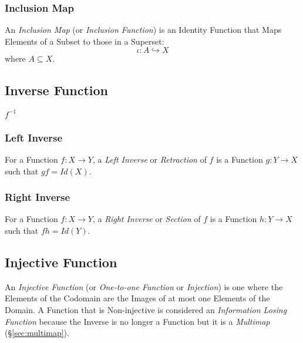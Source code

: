 \subsubsection{Inclusion Map}\label{sec:inclusion_map}

An \emph{Inclusion Map} (or \emph{Inclusion Function}) is an Identity
Function that Maps Elements of a Subset to those in a Superset:
\[
  \iota : A \hookrightarrow X
\]
where $A \subseteq X$.



\subsection{Inverse Function}\label{sec:inverse_function}

$f^{-1}$



\subsubsection{Left Inverse}\label{sec:left_inverse}

For a Function $f: X \rightarrow Y$, a \emph{Left Inverse} or
\emph{Retraction} of $f$ is a Function $g: Y \rightarrow X$ such that
$gf = Id(X)$.



\subsubsection{Right Inverse}\label{sec:right_inverse}

For a Function $f: X \rightarrow Y$, a \emph{Right Inverse} or
\emph{Section} of $f$ is a Function $h: Y \rightarrow X$ such that $fh
= Id(Y)$.



\subsection{Injective Function}\label{sec:injective_function}

An \emph{Injective Function} (or \emph{One-to-one Function} or
\emph{Injection}) is one where the Elements of the Codomain are the
Images of at most one Elements of the Domain. A Function that is
Non-injective is considered an \emph{Information Losing Function}
because the Inverse is no longer a Function but it is a
\emph{Multimap} (\S\ref{sec:multimap}).



